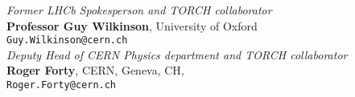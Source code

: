 \documentclass[11pt,a4paper]{article}
\begin{document}
\noindent\textit{Former LHCb Spokesperson and TORCH collaborator}\\
\noindent \textbf{Professor Guy Wilkinson}, University of Oxford\\
\texttt{Guy.Wilkinson@cern.ch}\\[5pt]

\noindent\textit{Deputy Head of CERN Physics department and TORCH collaborator}\\
\noindent \textbf{Roger Forty}, CERN, Geneva, CH, \\
\texttt{Roger.Forty@cern.ch}\\[5pt]





\end{document}

